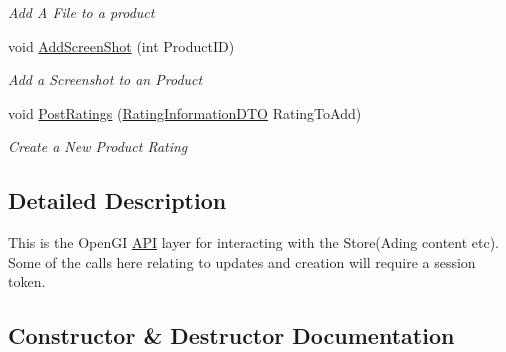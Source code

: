 \begin{DoxyCompactItemize}
\begin{DoxyCompactList}\small\item\em Add A File to a product \end{DoxyCompactList}\item 
void \hyperlink{class_open_1_1_g_i_1_1hypermart_1_1_controllers_1_1_store_content_controller_a7c5b861d456ae7b592165634a07c6738}{Add\+Screen\+Shot} (int Product\+ID)
\begin{DoxyCompactList}\small\item\em Add a Screenshot to an Product \end{DoxyCompactList}\item 
void \hyperlink{class_open_1_1_g_i_1_1hypermart_1_1_controllers_1_1_store_content_controller_ae9be0167fa1b3e2f785c08e04b602bc1}{Post\+Ratings} (\hyperlink{class_open_1_1_g_i_1_1hypermart_1_1_data_transformation_objects_1_1_rating_information_d_t_o}{Rating\+Information\+D\+TO} Rating\+To\+Add)
\begin{DoxyCompactList}\small\item\em Create a New Product Rating \end{DoxyCompactList}\end{DoxyCompactItemize}


\subsection{Detailed Description}
This is the Open\+GI \hyperlink{namespace_open_1_1_g_i_1_1hypermart_1_1_controllers_1_1_a_p_i}{A\+PI} layer for interacting with the Store(\+Ading content etc). Some of the calls here relating to updates and creation will require a session token. 



\subsection{Constructor \& Destructor Documentation}
\hypertarget{class_open_1_1_g_i_1_1hypermart_1_1_controllers_1_1_store_content_controller_a01bad24ca04f869ec58d136ff35b2d13}{}\label{class_open_1_1_g_i_1_1hypermart_1_1_controllers_1_1_store_content_controller_a01bad24ca04f869ec58d136ff35b2d13} 
